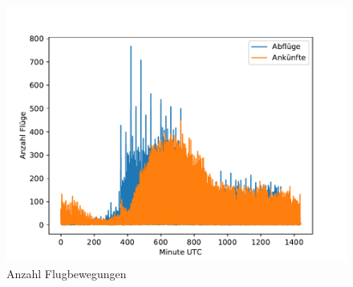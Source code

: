 \begin{figure}
    \centering
    \includegraphics[width=0.75\linewidth]{images/arr_dep_europe.pdf}
    \caption{Anzahl Flugbewegungen}
    \label{fig:arr-dep-europe}
\end{figure}

